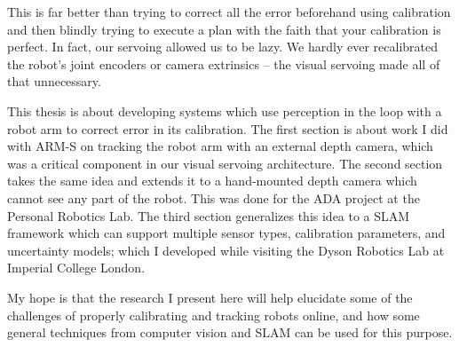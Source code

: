 This is far better than trying to correct all the error beforehand using calibration and then blindly trying to execute a plan with the faith that your calibration is perfect. In fact, our servoing allowed us to be lazy. We hardly ever recalibrated the robot's joint encoders or camera extrinsics -- the visual servoing made all of that unnecessary.

This thesis is about developing systems which use perception in the loop with a robot arm to correct error in its calibration. The first section is about work I did with ARM-S on tracking the robot arm with an external depth camera, which was a critical component in our visual servoing architecture. The second section takes the same idea and extends it to a hand-mounted depth camera which cannot see any part of the robot. This was done for the ADA project at the Personal Robotics Lab. The third section generalizes this idea to a SLAM framework which can support multiple sensor types, calibration parameters, and uncertainty models; which I developed while visiting the Dyson Robotics Lab at Imperial College London.

My hope is that the research I present here will help elucidate some of the challenges of properly calibrating and tracking robots online, and how some general techniques from computer vision and SLAM can be used for this purpose.